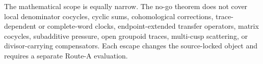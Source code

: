 The mathematical scope is equally narrow.  The no-go theorem does not cover
local denominator cocycles, cyclic sums, cohomological corrections,
trace-dependent or complete-word clocks, endpoint-extended transfer
operators, matrix cocycles, subadditive pressure, open groupoid traces,
multi-cusp scattering, or divisor-carrying compensators.  Each escape changes
the source-locked object and requires a separate Route-A evaluation.
